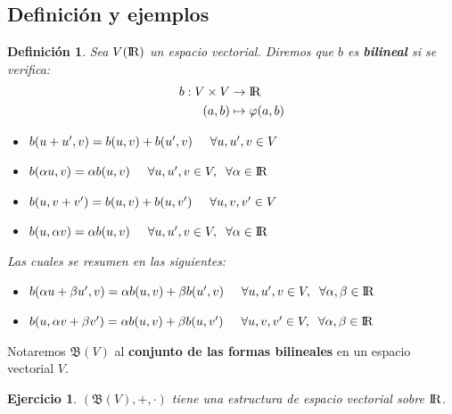 \documentclass[10pt, a4paper]{article}
\theoremstyle{theorem-style}
\theoremstyle{definition-style}
\newtheorem{ndef}{Definición}[section]
\theoremstyle{remark-style}
\theoremstyle{example-style}
\theoremstyle{definition-style}
\newtheorem{ejer}{Ejercicio}[section]
\theoremstyle{remark-style}
\begin{document}
\subsection{Definición y ejemplos}

\begin{ndef}
  Sea $V(\rm I\!R) $ un espacio vectorial. Diremos que $b$ es \textbf{bilineal} si se verifica:
   \begin{align*}
    b: V \times V & \rightarrow \rm I\!R \\
    (a,b) & \mapsto \varphi(a,b)
  \end{align*}
  \begin{itemize}
  \item[(1.1)] $b(u+u',v)=b(u,v)+b(u',v) \hspace{0.5cm} \forall u, u', v \in V $
  \item[(1.2)] $b(\alpha u,v)=\alpha b(u,v) \hspace{0.5cm} \forall u, u', v \in V,\hspace{0.2cm} \forall \alpha \in \rm I\!R $
  \item[(2.1)] $b(u,v+v')=b(u,v)+b(u,v') \hspace{0.5cm} \forall u, v, v' \in V $
  \item[(2.2)] $b(u,\alpha v)=\alpha b(u,v) \hspace{0.5cm} \forall u, u', v \in V,\hspace{0.2cm} \forall \alpha \in \rm I\!R $
  \end{itemize}
Las cuales se resumen en las siguientes:
  \begin{itemize}
  \item[(1)] $b(\alpha u+\beta u',v)=\alpha b(u,v)+ \beta b(u',v) \hspace{0.5cm} \forall u, u', v \in V,\hspace{0.2cm} \forall \alpha, \beta \in \rm I\!R$
  \item[(2)] $b(u,\alpha v+\beta v')=\alpha b(u,v)+ \beta b(u,v') \hspace{0.5cm} \forall u, v, v' \in V,\hspace{0.2cm} \forall \alpha, \beta \in \rm I\!R$
  \end{itemize}
\end{ndef}

Notaremos $\mathfrak{B}(V)$ al \textbf{conjunto de las formas bilineales} en un espacio vectorial $V$.

\pagebreak

\begin{ejer}
  $(\mathfrak{B}(V), +, \cdot)$ tiene una estructura de espacio vectorial sobre $\rm I\!R$.
\end{ejer}
\end{document}
